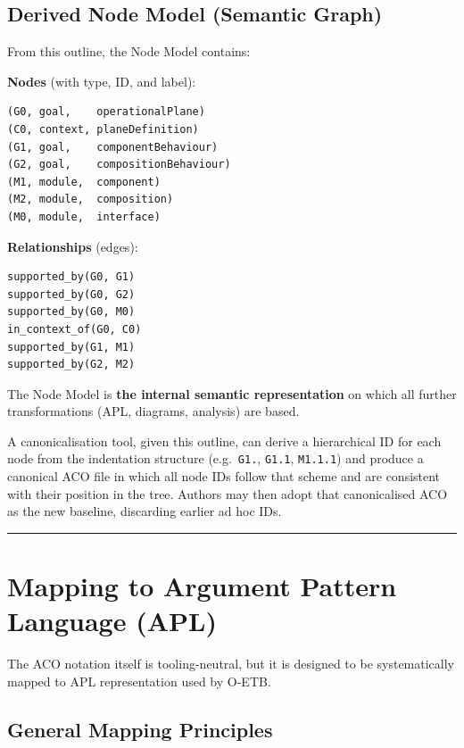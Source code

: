 \documentclass[11pt]{article}
\begin{document}
\subsection{Derived Node Model (Semantic Graph)}

From this outline, the Node Model contains:

\textbf{Nodes} (with type, ID, and label):
\begin{verbatim}
(G0, goal,    operationalPlane)
(C0, context, planeDefinition)
(G1, goal,    componentBehaviour)
(G2, goal,    compositionBehaviour)
(M1, module,  component)
(M2, module,  composition)
(M0, module,  interface)
\end{verbatim}

\textbf{Relationships} (edges):
\begin{verbatim}
supported_by(G0, G1)
supported_by(G0, G2)
supported_by(G0, M0)
in_context_of(G0, C0)
supported_by(G1, M1)
supported_by(G2, M2)
\end{verbatim}

The Node Model is \textbf{the internal semantic representation} on which all further transformations (APL, diagrams, analysis) are based.

A canonicalisation tool, given this outline, can derive a hierarchical ID for each node from the indentation structure (e.g.\ \texttt{G1.}, \texttt{G1.1}, \texttt{M1.1.1}) and produce a canonical ACO file in which all node IDs follow that scheme and are consistent with their position in the tree. Authors may then adopt that canonicalised ACO as the new baseline, discarding earlier ad hoc IDs.

\bigskip
\hrule
\bigskip

\section{Mapping to Argument Pattern Language (APL)}

The ACO notation itself is tooling-neutral, but it is designed to be systematically mapped to APL representation used by O-ETB.

\subsection{General Mapping Principles}
\end{document}

